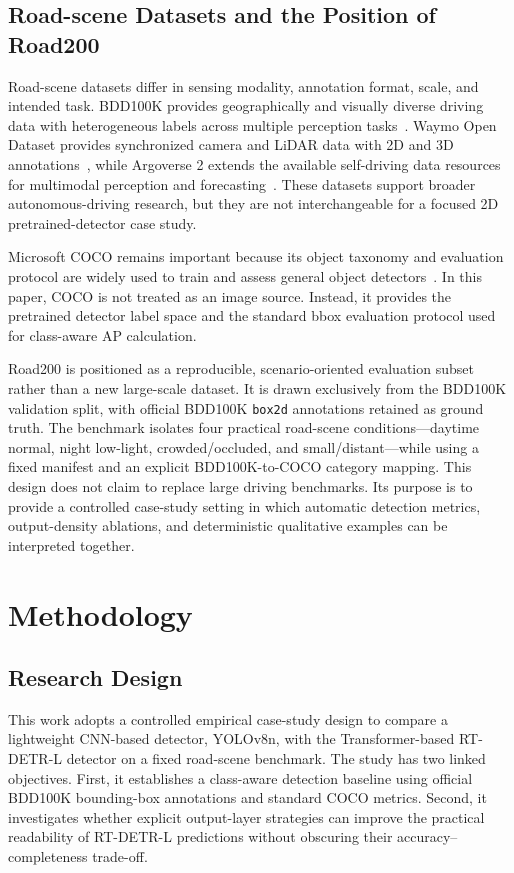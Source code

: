 \documentclass[runningheads]{llncs}
\begin{document}
\subsection{Road-scene Datasets and the Position of Road200}

Road-scene datasets differ in sensing modality, annotation format, scale, and intended task. BDD100K provides geographically and visually diverse driving data with heterogeneous labels across multiple perception tasks~\cite{yu2020bdd100k}. Waymo Open Dataset provides synchronized camera and LiDAR data with 2D and 3D annotations~\cite{sun2020waymo}, while Argoverse 2 extends the available self-driving data resources for multimodal perception and forecasting~\cite{wilson2023argoverse2}. These datasets support broader autonomous-driving research, but they are not interchangeable for a focused 2D pretrained-detector case study.

Microsoft COCO remains important because its object taxonomy and evaluation protocol are widely used to train and assess general object detectors~\cite{lin2014coco}. In this paper, COCO is not treated as an image source. Instead, it provides the pretrained detector label space and the standard bbox evaluation protocol used for class-aware AP calculation.

Road200 is positioned as a reproducible, scenario-oriented evaluation subset rather than a new large-scale dataset. It is drawn exclusively from the BDD100K validation split, with official BDD100K \texttt{box2d} annotations retained as ground truth. The benchmark isolates four practical road-scene conditions---daytime normal, night low-light, crowded/occluded, and small/distant---while using a fixed manifest and an explicit BDD100K-to-COCO category mapping. This design does not claim to replace large driving benchmarks. Its purpose is to provide a controlled case-study setting in which automatic detection metrics, output-density ablations, and deterministic qualitative examples can be interpreted together.

\FloatBarrier

\section{Methodology}

\subsection{Research Design}

This work adopts a controlled empirical case-study design to compare a lightweight CNN-based detector, YOLOv8n, with the Transformer-based RT-DETR-L detector on a fixed road-scene benchmark. The study has two linked objectives. First, it establishes a class-aware detection baseline using official BDD100K bounding-box annotations and standard COCO metrics. Second, it investigates whether explicit output-layer strategies can improve the practical readability of RT-DETR-L predictions without obscuring their accuracy--completeness trade-off.
\end{document}
